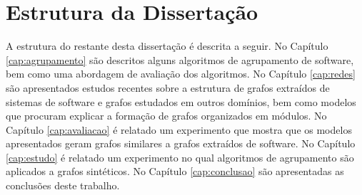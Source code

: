 % 
% 

\section{Estrutura da Dissertação}

A estrutura do restante desta dissertação é descrita a seguir. 
%
No Capítulo \ref{cap:agrupamento} são descritos alguns algoritmos de agrupamento de software, bem como uma abordagem de avaliação dos algoritmos.
%
No Capítulo \ref{cap:redes} são apresentados estudos recentes sobre a estrutura de grafos extraídos de sistemas de software e grafos estudados em outros domínios, bem como modelos que procuram explicar a formação de grafos organizados em módulos.
%
No Capítulo \ref{cap:avaliacao} é relatado um experimento que mostra que os modelos apresentados geram grafos similares a grafos extraídos de software.
%
No Capítulo \ref{cap:estudo} é relatado um experimento no qual algoritmos de agrupamento são aplicados a grafos sintéticos.
%
No Capítulo \ref{cap:conclusao} são apresentadas as conclusões deste trabalho. 


